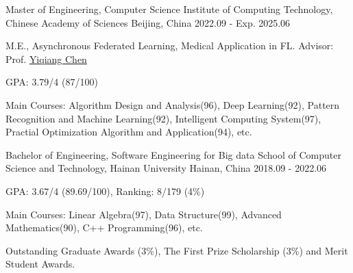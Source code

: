 

\begin{cventries}

\cventry
{Master of Engineering, Computer Science} %
{Institute of Computing Technology, Chinese Academy of Sciences} %
{Beijing, China} %
{2022.09 - Exp. 2025.06} %
{
  \begin{cvitems} %
    \item {M.E., Asynchronous Federated Learning, Medical Application in FL. Advisor: Prof. \href{https://www.ict.cas.cn/sourcedb_ict_cas/cn/jssrck/200909/t20090917_2496596.html}{Yiqiang Chen}}
    \item {GPA: 3.79/4 (87/100)}
    \item {Main Courses: Algorithm Design and Analysis(96), Deep Learning(92), Pattern Recognition and Machine Learning(92), Intelligent Computing System(97), Practial Optimization Algorithm and Application(94), etc.}
  \end{cvitems}
}

\cventry
{Bachelor of Engineering, Software Engineering for Big data} %
{School of Computer Science and Technology, Hainan University} %
{Hainan, China} %
{2018.09 - 2022.06} %
{
  \begin{cvitems} %
    \item {GPA: 3.67/4 (89.69/100), Ranking: 8/179 (4\%)} %
    \item {Main Courses: Linear Algebra(97), Data Structure(99), Advanced Mathematics(90), C++ Programming(96), etc.}
    \item {Outstanding Graduate Awards (3\%), The First Prize Scholarship (3\%) and Merit Student Awards.}
  \end{cvitems}
}

\end{cventries}
